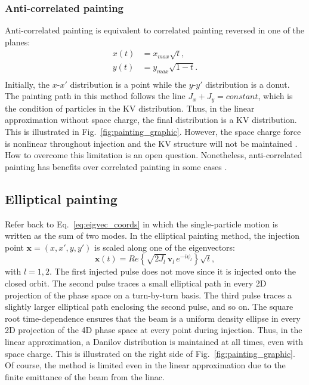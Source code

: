 \subsubsection{Anti-correlated painting}

Anti-correlated painting is equivalent to correlated painting reversed in one of the planes:
%
\begin{equation}
\begin{aligned}
    {x}(t) &= x_{max}\sqrt{t}, \\
    {y}(t) &= y_{max}\sqrt{1 - t}. \\
\end{aligned}
\end{equation}
%
Initially, the $x$-$x'$ distribution is a point while the $y$-$y'$ distribution is a donut. The painting path in this method follows the line $J_x + J_y = constant$, which is the condition of particles in the KV distribution. Thus, in the linear approximation without space charge, the final distribution is a KV distribution. This is illustrated in Fig.~\ref{fig:painting_graphic}. However, the space charge force is nonlinear throughout injection and the KV structure will not be maintained \cite{Crosbie1996}. How to overcome this limitation is an open question. Nonetheless, anti-correlated painting has benefits over correlated painting in some cases \cite{Hotchi2020}.


\subsection{Elliptical painting}

Refer back to Eq.~\eqref{eq:eigvec_coords} in which the single-particle motion is written as the sum of two modes. In the elliptical painting method, the injection point $\mathbf{x} = (x, x', y, y')$ is scaled along one of the eigenvectors:
%
\begin{equation}\label{eq:elliptical_painting}
    \mathbf{x}(t) =  
    Re \left\{ \sqrt{2 J_l} \, \mathbf{v}_l \, e^{-i\psi_l} \right\} \sqrt{t},
\end{equation}
%
with $l = 1,2$. The first injected pulse does not move since it is injected onto the closed orbit. The second pulse traces a small elliptical path in every 2D projection of the phase space on a turn-by-turn basis. The third pulse traces a slightly larger elliptical path enclosing the second pulse, and so on. The square root time-dependence ensures that the beam is a uniform density ellipse in every 2D projection of the 4D phase space at every point during injection. Thus, in the linear approximation, a Danilov distribution is maintained at all times, even with space charge. This is illustrated on the right side of Fig.~\ref{fig:painting_graphic}. Of course, the method is limited even in the linear approximation due to the finite emittance of the beam from the linac.

